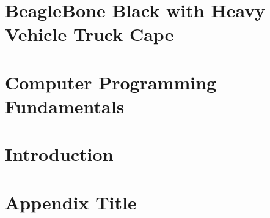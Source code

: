\chapter{BeagleBone Black with Heavy Vehicle Truck Cape}


\chapter{Computer Programming Fundamentals}


\chapter{Introduction}


\appendix
\chapter{Appendix Title}


